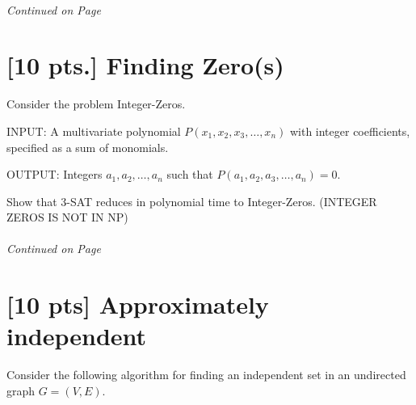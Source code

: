 \documentclass[11pt]{article}
\begin{document}
\label{pg:end-of-p2}
%
\paragraph{} \emph{Continued on Page \pageref{pg:p2-continuation}}

\newpage

\section{[10 pts.] Finding Zero(s)} 

Consider the problem Integer-Zeros. 

INPUT: A multivariate polynomial $P(x_1,x_2,x_3,\ldots,x_n)$ with integer
coefficients, specified as a sum of monomials. 

OUTPUT: Integers $a_1,a_2,\ldots,a_n$ such that $P(a_1,a_2,a_3,\ldots,a_n)=0$.

Show that 3-SAT reduces in polynomial time to Integer-Zeros. (INTEGER ZEROS
IS NOT IN NP)   
  
\label{pg:end-of-p3}

% 
\paragraph{} \emph{Continued on Page \pageref{pg:p3-continuation}}

\newpage

\section{[10 pts] Approximately independent}

Consider the following algorithm for finding an independent set in an 
undirected graph $G=(V,E)$.



\label{pg:end-of-p4}

\end{document}
